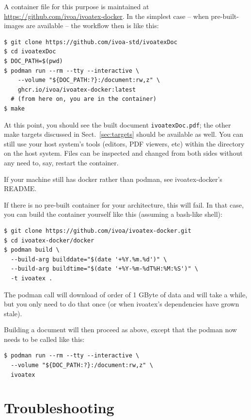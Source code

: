 \documentclass[11pt,a4paper]{ivoa}
\begin{document}
A container file for this purpose is maintained at
\url{https://github.com/ivoa/ivoatex-docker}.  In the simplest case --
when pre-built-images are available -- the workflow then is like this:

\begin{lstlisting}
$ git clone https://github.com/ivoa-std/ivoatexDoc
$ cd ivoatexDoc
$ DOC_PATH=$(pwd)
$ podman run --rm --tty --interactive \
    --volume "${DOC_PATH:?}:/document:rw,z" \
    ghcr.io/ivoa/ivoatex-docker:latest
  # (from here on, you are in the container)
$ make
\end{lstlisting}

At this point, you should see the built document \verb|ivoatexDoc.pdf|;
the other make targets discussed in Sect.~\ref{sec:targets} should be
available as well.  You can still use your host system's tools (editors,
PDF viewers, etc) within the directory on the host system.  Files can be
inspected and changed from both sides without any need to, say, restart
the container.

If your machine still has docker rather than podman, see
ivoatex-docker's README.

If there is no pre-built container for your architecture, this will
fail.  In that case, you can build the container yourself like this
(assuming a bash-like shell):

\begin{lstlisting}
$ git clone https://github.com/ivoa/ivoatex-docker.git
$ cd ivoatex-docker/docker
$ podman build \
  --build-arg builddate="$(date '+%Y.%m.%d')" \
  --build-arg buildtime="$(date '+%Y-%m-%dT%H:%M:%S')" \
  -t ivoatex .
\end{lstlisting}

The podman call will download of order of 1 GByte of data and will take
a while, but you only need to do that once (or when ivoatex's
dependencies have grown stale).

Building a document will then proceed as above, except that the podman
now needs to be called like this:

\begin{lstlisting}
$ podman run --rm --tty --interactive \
  --volume "${DOC_PATH:?}:/document:rw,z" \
  ivoatex
\end{lstlisting}

\section{Troubleshooting}
\end{document}
